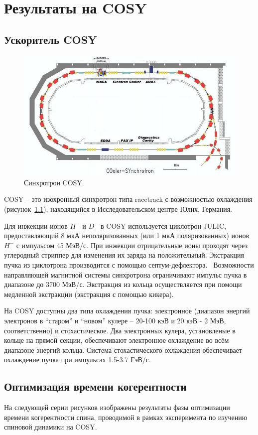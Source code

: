 \chapter{Результаты на COSY}\label{chpt4:COSY}

\section{Ускоритель COSY}

\begin{figure}[h]
	\centering
	\includegraphics[scale=.5]{images/chapter4/800px-COSY_Ring}
	\caption{Синхротрон COSY.\label{fig:COSY_Ring}}
\end{figure}

COSY -- это изохронный синхротрон типа racetrack с возможностью охлаждения (рисунок~\ref{fig:COSY_Ring}), находящийся в Исследовательском центре Юлих, Германия.~\cite{COSY-Ring}

Для инжекции ионов $H^-$ и $D^-$ в COSY  используется циклотрон JULIC, предоставляющий 8 мкА неполяризованных (или 1 мкА поляризованных) ионов $H^-$ с импульсом 45 МэВ/с. При инжекции отрицательные ионы проходят через углеродный стриппер для изменения их заряда на положительный. Экстракция пучка из циклотрона производится с помощью септум-дефлектора.~\cite{JULIC-Injector}
%
Возможности направляющей магнитной системы синхротрона ограничивают импульс пучка в диапазоне до 3700 МэВ/с. Экстракция из кольца осуществляется при помощи медленной экстракции (экстракция с помощью кикера).

На COSY доступны два типа охлаждения пучка: электронное (диапазон энергий электронов в ``старом'' и ``новом'' кулере -- 20-100 кэВ и 20 кэВ - 2 МэВ, соответственно) и стохастическое. 
%
Два электронных кулера, установленые в кольце на прямой секции, обеспечивают электронное охлаждение во всём диапазоне энергий кольца. Система стохастического охлаждения обеспечивает охлаждение пучка при импульсах 1.5-3.7 ГэВ/с.


\section{Оптимизация времени когерентности}
На следующей серии рисунков изображены результаты фазы оптимизации времени когерентности спина,
проводимой в рамках эксперимента по изучению спиновой динамики на COSY.


\clearpage
